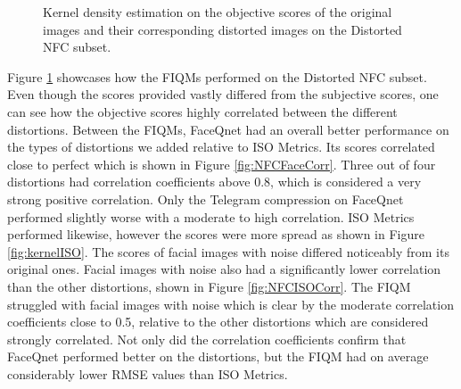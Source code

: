 \begin{figure}[h]
\centering
    \caption{Kernel density estimation on the objective scores of the original images and their corresponding distorted images on the Distorted NFC subset.}
    \label{fig:NFC2Kernel}
\end{figure}

Figure \ref{fig:NFC2Kernel} showcases how the FIQMs performed on the Distorted NFC subset. Even though the scores provided vastly differed from the subjective scores, one can see how the objective scores highly correlated between the different distortions. Between the FIQMs, FaceQnet had an overall better performance on the types of distortions we added relative to ISO Metrics. Its scores correlated close to perfect which is shown in Figure \ref{fig:NFCFaceCorr}. Three out of four distortions had correlation coefficients above 0.8, which is considered a very strong positive correlation. Only the Telegram compression on FaceQnet performed slightly worse with a moderate to high correlation. ISO Metrics performed likewise, however the scores were more spread as shown in Figure \ref{fig:kernelISO}. The scores of facial images with noise differed noticeably from its original ones. Facial images with noise also had a significantly lower correlation than the other distortions, shown in Figure \ref{fig:NFCISOCorr}. The FIQM struggled with facial images with noise which is clear by the moderate correlation coefficients close to 0.5, relative to the other distortions which are considered strongly correlated. Not only did the correlation coefficients confirm that FaceQnet performed better on the distortions, but the FIQM had on average considerably lower RMSE values than ISO Metrics. 


